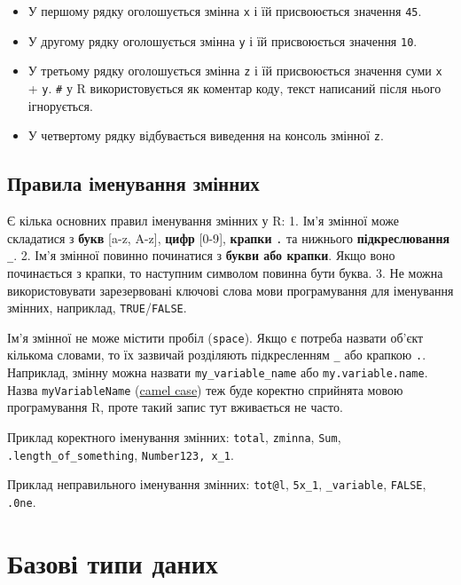 \documentclass[
]{book}
\providecommand{\tightlist}{%
  \setlength{\itemsep}{0pt}\setlength{\parskip}{0pt}}
\begin{document}
\begin{itemize}
\tightlist
\item
  У першому рядку оголошується змінна \texttt{x} і їй присвоюється значення \texttt{45}.
\item
  У другому рядку оголошується змінна \texttt{y} і їй присвоюється значення \texttt{10}.
\item
  У третьому рядку оголошується змінна \texttt{z} і їй присвоюється значення суми \texttt{x} + \texttt{y}.
  \texttt{\#} у R використовується як коментар коду, текст написаний після нього ігнорується.
\item
  У четвертому рядку відбувається виведення на консоль змінної \texttt{z}.
\end{itemize}

\hypertarget{chapter212}{%
\subsection{Правила іменування змінних}\label{chapter212}}

Є кілька основних правил іменування змінних у R:
1. Ім'я змінної може складатися з \textbf{букв} {[}a-z, A-z{]}, \textbf{цифр} {[}0-9{]}, \textbf{крапки} \texttt{.} та нижнього \textbf{підкреслювання} \texttt{\_}.
2. Ім'я змінної повинно починатися з \textbf{букви або крапки}. Якщо воно починається з крапки, то наступним символом повинна бути буква.
3. Не можна використовувати зарезервовані ключові слова мови програмування для іменування змінних, наприклад, \texttt{TRUE}/\texttt{FALSE}.

Ім'я змінної не може містити пробіл (\texttt{space}). Якщо є потреба назвати об'єкт кількома словами, то їх зазвичай розділяють підкресленням \texttt{\_} або крапкою \texttt{.}. Наприклад, змінну можна назвати \texttt{my\_variable\_name} або \texttt{my.variable.name}. Назва \texttt{myVariableName} (\href{https://en.wikipedia.org/wiki/Camel_case}{camel case}) теж буде коректно сприйнята мовою програмування R, проте такий запис тут вживається не часто.

{Приклад коректного іменування змінних:} \texttt{total}, \texttt{zminna}, \texttt{Sum}, \texttt{.length\_of\_something}, \texttt{Number123,\ x\_1}.

{Приклад неправильного іменування змінних:} \texttt{tot@l}, \texttt{5x\_1}, \texttt{\_variable}, \texttt{FALSE}, \texttt{.0ne}.

\hypertarget{chapter22}{%
\section{Базові типи даних}\label{chapter22}}
\end{document}
